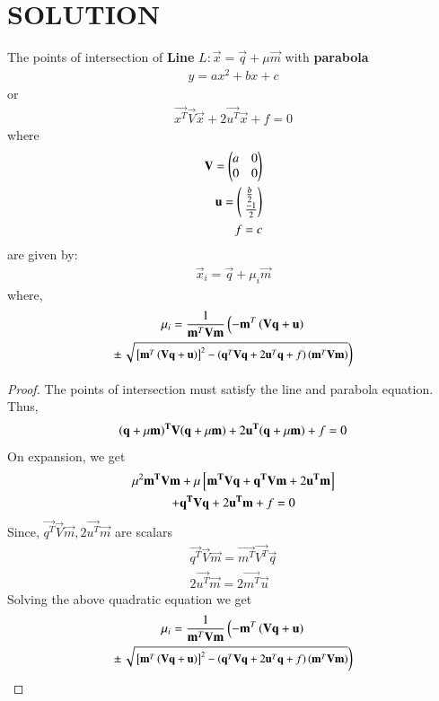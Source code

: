 \documentclass[journal,12pt,twocolumn]{IEEEtran}
\begin{document}
\section{SOLUTION}
\begin{lemma}
The points of intersection of \textbf{Line} $L:\vec{x}=\vec{q}+\mu\vec{m}$ with \textbf{parabola}
\begin{align}
    y=ax^2+bx+c
    \end{align}
    or
\begin{align}
\vec{x^T}\vec{V}\vec{x}+2\vec{u^T}\vec{x}+f=0
\end{align}
where
\begin{align}
    \mathbf{V}=\begin{pmatrix}a & 0 \\ 0 & 0\end{pmatrix}\\
    \mathbf{u}=\begin{pmatrix}\frac{b}{2}\\\ \frac{-1}{2}\end{pmatrix}\\
    f=c
\end{align}
are given by:
\begin{align}
\vec{x}_i = \vec{q}+\mu_i\vec{m}
\end{align}
%
where,
\begin{multline}
\mu_i = \frac{1}
{
\mathbf{m}^T\mathbf{V}\mathbf{m}
}
\left(-\mathbf{m}^T\left(\mathbf{V}\mathbf{q}+\mathbf{u}\right)\right.
\\
\pm
{\small
\ensuremath{\left.\sqrt{
{}\left[
\mathbf{m}^T\left(\mathbf{V}\mathbf{q}+\mathbf{u}\right)
\right]^2
-
\left(
\mathbf{q}^T\mathbf{V}\mathbf{q} + 2\mathbf{u}^T\mathbf{q} +f
\right)
\left(\mathbf{m}^T\mathbf{V}\mathbf{m}\right)
}
\right)}
}\label{quad}
\end{multline}
\end{lemma}
\begin{proof}
The points of intersection must satisfy the line and parabola equation.
Thus,
\begin{align}
\mathbf{\left(\mathbf{q}+\mu\mathbf{m}\right)^T}\mathbf{V}\mathbf{\left(\mathbf{q}+ \mu\mathbf{m}\right)}+2\mathbf{u^T}\mathbf{\left(\mathbf{q}+\mu\mathbf{m}\right)}+f=0
\end{align}
On expansion, we get
\begin{multline}
  \mu^2\mathbf{m^T}\mathbf{V}\mathbf{m}+ \mu{}\left[\mathbf{m^T}\mathbf{V}\mathbf{q}+\mathbf{q^T}\mathbf{V}\mathbf{m}+2\mathbf{u^T}\mathbf{m}\right]\\ + \mathbf{q^T}\mathbf{V}\mathbf{q}+2\mathbf{u^T}\mathbf{m}+f=0  
\end{multline}
Since, $\vec{q^T}\vec{V}\vec{m},2\vec{u^T}\vec{m}$ are scalars
\begin{align}
 \vec{q^T}\vec{V}\vec{m}=\vec{m^T}\vec{V^T}\vec{q} \\
 2\vec{u^T}\vec{m}=2\vec{m^T}\vec{u}
\end{align}
Solving the above quadratic equation we get
\begin{multline}
\mu_i = \frac{1}
{\mathbf{m}^T\mathbf{V}\mathbf{m}
}\left(-\mathbf{m}^T\left(\mathbf{V}\mathbf{q}+\mathbf{u}\right)\right.
\\\pm{\small
\ensuremath{\left.\sqrt{
{}\left[
\mathbf{m}^T\left(\mathbf{V}\mathbf{q}+\mathbf{u}\right)
\right]^2-\left(\mathbf{q}^T\mathbf{V}\mathbf{q} + 2\mathbf{u}^T\mathbf{q} +f
\right)\left(\mathbf{m}^T\mathbf{V}\mathbf{m}\right)
}\right)}}
\end{multline}
\end{proof}
\end{document}
